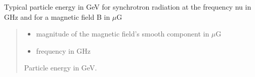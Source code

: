 \documentclass[letterpaper,10pt,english]{sphinxmanual}
\begin{document}
\begin{fulllineitems}
\label{\detokenize{diffsph.spectra:diffsph.spectra.synchrotron.Enu}}
\pysigstartsignatures
{}
\pysigstopsignatures
\sphinxAtStartPar
Typical particle energy in GeV for synchrotron radiation at the frequency nu in GHz and for a magnetic field B in \(\mu\)G
\begin{quote}\begin{description}
\begin{itemize}
\item {} 
\sphinxAtStartPar
{} \textendash{} magnitude of the magnetic field’s smooth component in \(\mu\)G

\item {} 
\sphinxAtStartPar
{} \textendash{} frequency in GHz

\end{itemize}

\sphinxAtStartPar
Particle energy in GeV.

\end{description}\end{quote}

\end{fulllineitems}

\end{document}
